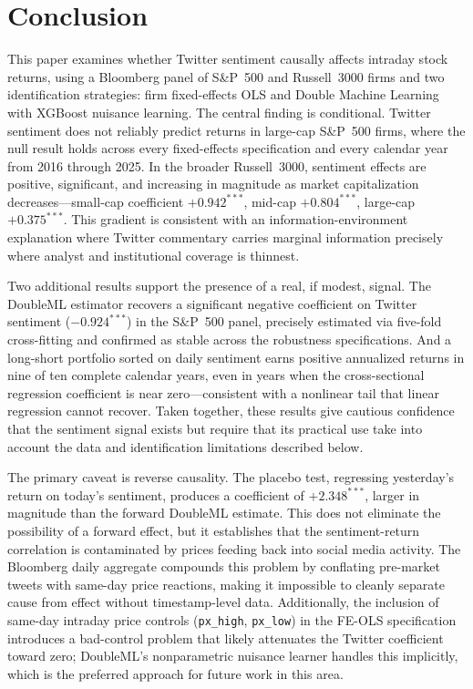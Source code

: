 
\section{Conclusion}\label{conclusion}

This paper examines whether Twitter sentiment causally affects intraday stock
returns, using a Bloomberg panel of S\&P~500 and Russell~3000 firms and two
identification strategies: firm fixed-effects OLS and Double Machine Learning
with XGBoost nuisance learning. The central finding is conditional. Twitter
sentiment does not reliably predict returns in large-cap S\&P~500 firms, where
the null result holds across every fixed-effects specification and every
calendar year from 2016 through 2025. In the broader Russell~3000, sentiment
effects are positive, significant, and increasing in magnitude as market
capitalization decreases---small-cap coefficient $+0.942^{***}$, mid-cap
$+0.804^{***}$, large-cap $+0.375^{***}$. This gradient is consistent with
an information-environment explanation where Twitter commentary carries marginal
information precisely where analyst and institutional coverage is thinnest.

Two additional results support the presence of a real, if modest, signal. The
DoubleML estimator recovers a significant negative coefficient on Twitter
sentiment ($-0.924^{***}$) in the S\&P~500 panel, precisely estimated via
five-fold cross-fitting and confirmed as stable across the robustness specifications. And a long-short portfolio sorted on
daily sentiment earns positive annualized returns in nine of ten complete
calendar years, even in years when the cross-sectional regression coefficient
is near zero---consistent with a nonlinear tail that linear regression
cannot recover. Taken together, these results give cautious confidence that
the sentiment signal exists but require that its practical use take into
account the data and identification limitations described below.

The primary caveat is reverse causality. The placebo test, regressing
yesterday's return on today's sentiment, produces a coefficient of
$+2.348^{***}$, larger in magnitude than the forward DoubleML estimate. This
does not eliminate the possibility of a forward effect, but it establishes that
the sentiment-return correlation is contaminated by prices feeding
back into social media activity. The Bloomberg daily aggregate compounds this
problem by conflating pre-market tweets with same-day price reactions, making
it impossible to cleanly separate cause from effect without timestamp-level
data. Additionally, the inclusion of same-day intraday price controls
(\texttt{px\_high}, \texttt{px\_low}) in the FE-OLS specification introduces a
bad-control problem that likely attenuates the Twitter coefficient toward zero;
DoubleML's nonparametric nuisance learner handles this implicitly, which is the
preferred approach for future work in this area.

